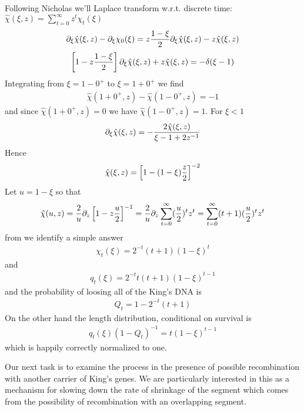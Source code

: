 \documentclass{article}
\begin{document}
Following Nicholas we'll Laplace transform w.r.t. discrete time: $\hat{\chi} (\xi, z)=\sum_{t=0}^{\infty}z^t \chi_{t}(\xi)$
\begin{eqnarray}
\partial_{\xi} \hat{\chi} (\xi, z)-\partial_{\xi} \chi_{0}(\xi)=z{1-\xi \over 2}\partial_{\xi} \hat{\chi} (\xi, z)-z\hat{\chi} (\xi, z)
\end{eqnarray}
\begin{eqnarray}
\left [ 1-z{1-\xi \over 2} \right ]\partial_{\xi} \hat{\chi} (\xi, z)+z\hat{\chi} (\xi, z)=-\delta (\xi-1)
\end{eqnarray}
Integrating from $\xi=1-0^+$ to $\xi=1+0^+$ we find
\begin{eqnarray}
 \hat{\chi} (1+0^+, z)- \hat{\chi} (1-0^+, z)=-1
\end{eqnarray}
and since $\hat{\chi} (1+0^+, z)=0$  we have $\hat{\chi} (1-0^+, z)=1$. For $\xi <1$
\begin{eqnarray}
\partial_{\xi} \hat{\chi} (\xi, z)= - {2 \hat{\chi} (\xi, z) \over \xi-1+2z^{-1}}
\end{eqnarray}
Hence
\begin{eqnarray}
\hat{\chi} (\xi, z) = \left [ 1-(1-\xi){z \over 2} \right ]^{-2}
\end{eqnarray}
Let $u=1-\xi$ so that
\begin{eqnarray}
\hat{\chi} (u, z) = {2 \over u} \partial_z \left [ 1-z{u \over 2} \right ]^{-1}={2 \over u} \partial_z \sum_{t=0}^{\infty} ({ u \over 2 })^t z^t =\sum_{t=0}^{\infty} (t+1)({ u \over 2 })^t z^t 
\end{eqnarray}
from we identify a simple answer
\begin{eqnarray}
\chi_t ( \xi) =  2^{-t}(t+1)(1-\xi)^t 
\end{eqnarray}
and
\begin{eqnarray}
q_t ( \xi) =  2^{-t}t(t+1)(1-\xi)^{t-1} 
\end{eqnarray}
and the probability of loosing all of the King's DNA is
\begin{eqnarray}
Q_t  =  1-2^{-t}(t+1) 
\end{eqnarray}
On the other hand the length distribution, conditional on survival is
\begin{eqnarray}
q_t ( \xi)(1-Q_t)^{-1} =  t(1-\xi)^{t-1} 
\end{eqnarray}
which is happily correctly normalized to one.

Our next task is to examine the process in the presence of possible recombination with another carrier of King's genes. We are particularly interested in this as a mechanism for slowing down the rate of shrinkage of the segment which comes from the possibility of recombination with an overlapping segment. 
\end{document}
